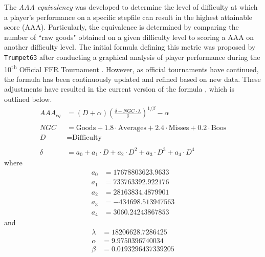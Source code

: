 The \textit{AAA equivalency} was developed to determine the level of difficulty at which a player's performance on a specific stepfile can result in the highest attainable score (AAA). Particularly, the equivalence is determined by comparing the number of ``raw goods" obtained on a given difficulty level to scoring a AAA on another difficulty level. The initial formula defining this metric was proposed by \texttt{Trumpet63} after conducting a graphical analysis of player performance during the 10\textsuperscript{th} Official FFR Tournament \cite{20140930}. However, as official tournaments have continued, the formula has been continuously updated and refined based on new data. These adjustments have resulted in the current version of the formula \cite{20150216}, which is outlined below.
\begin{align*}
	AAA_{eq} & = (D + \alpha) \left( \frac{\delta - NGC \cdot \lambda}{\delta}\right)^{1 / \beta} - \alpha  \\
	\\
	NGC      & = \text{Goods} + 1.8 \cdot \text{Averages} + 2.4 \cdot \text{Misses} + 0.2 \cdot \text{Boos} \\
	D        & = \text{Difficulty}                                                                          \\
	\\
	\delta   & = a_0 + a_1 \cdot D + a_2 \cdot D^2 + a_3 \cdot D^3 + a_4 \cdot D^4
\end{align*}
where
\begin{align*}
	a_0      & = 17678803623.9633                                                                           \\
	a_1      & = 733763392.922176                                                                           \\
	a_2      & = 28163834.4879901                                                                           \\
	a_3      & = -434698.513947563                                                                          \\
	a_4      & = 3060.24243867853
\end{align*}
and
\begin{align*}
	\lambda  & = 18206628.7286425                                                                           \\
	\alpha   & = 9.9750396740034                                                                            \\
	\beta    & = 0.0193296437339205                                                                         
\end{align*}

